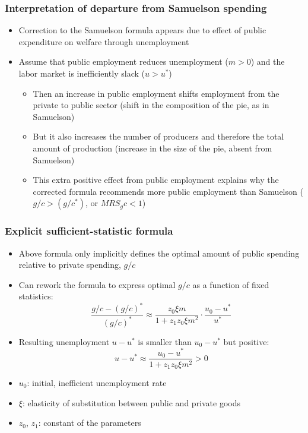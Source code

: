 \documentclass[11pt,aspectratio=169,xcolor={dvipsnames},hyperref={pdftex,pdfpagemode=UseNone,hidelinks,pdfdisplaydoctitle=true},usepdftitle=false]{beamer}
\begin{document}
\begin{frame}
\frametitle{Interpretation of departure from Samuelson spending}
\begin{itemize}
\item Correction to the Samuelson formula appears due to effect of public expenditure on welfare through unemployment
\item Assume that public employment reduces unemployment ($ m> 0$) and the labor market is inefficiently slack ($u>u^*$)
\begin{itemize}
\item Then an increase in public employment shifts employment from the private to public sector (shift in the composition of the pie, as in Samuelson)
\item But it also increases the number of producers and therefore the total amount of production (increase in the size of the pie, absent from Samuelson)
\item This extra positive effect from public employment explains why the corrected formula recommends more public employment than Samuelson ($g/c > (g/c^*)$, or $MRS_gc<1$)
\end{itemize}
\end{itemize}	
\end{frame}

\begin{frame}
\frametitle{Explicit sufficient-statistic formula}
\begin{itemize}
\item Above formula only implicitly defines the optimal amount of public spending relative to private spending, $g/c$
\item Can rework the formula to express optimal $g/c$ as a function of fixed statistics:
\begin{equation*}
\frac{g/c-(g/c)^{*}}{(g/c)^{*}}\approx \frac{z_0\xi m}{1+  z_1 z_0 \xi m^{2}} \cdot \frac{u_{0}-u^{*}}{u^{*}}
\end{equation*}
\item Resulting unemployment $u-u^*$ is smaller than $u_0-u^*$ but positive:
\begin{equation*}
u-u^{*} \approx \frac{u_{0}-u^{*}}{1+ z_1 z_0 \xi m^{2}}>0
\end{equation*}
\item $u_0$: initial, inefficient unemployment rate
\item $\xi$: elasticity of substitution between public and private goods
\item $z_0$, $z_1$: constant of the parameters
\end{itemize}
\end{frame}
\end{document}
